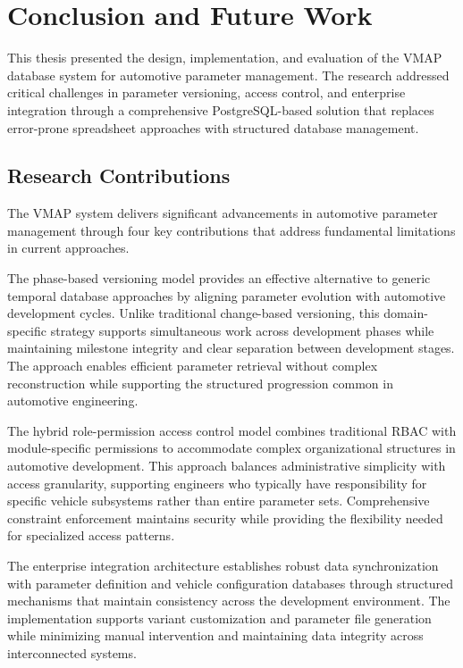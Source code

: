 \chapter{Conclusion and Future Work}
\label{chap:conclusion}

This thesis presented the design, implementation, and evaluation of the \ac{VMAP} database system for automotive parameter management. The research addressed critical challenges in parameter versioning, access control, and enterprise integration through a comprehensive PostgreSQL-based solution that replaces error-prone spreadsheet approaches with structured database management.

\section{Research Contributions}
\label{sec:research-contributions}

The \ac{VMAP} system delivers significant advancements in automotive parameter management through four key contributions that address fundamental limitations in current approaches.

The phase-based versioning model provides an effective alternative to generic temporal database approaches by aligning parameter evolution with automotive development cycles. Unlike traditional change-based versioning, this domain-specific strategy supports simultaneous work across development phases while maintaining milestone integrity and clear separation between development stages. The approach enables efficient parameter retrieval without complex reconstruction while supporting the structured progression common in automotive engineering.

The hybrid role-permission access control model combines traditional \ac{RBAC} with module-specific permissions to accommodate complex organizational structures in automotive development. This approach balances administrative simplicity with access granularity, supporting engineers who typically have responsibility for specific vehicle subsystems rather than entire parameter sets. Comprehensive constraint enforcement maintains security while providing the flexibility needed for specialized access patterns.

The enterprise integration architecture establishes robust data synchronization with parameter definition and vehicle configuration databases through structured mechanisms that maintain consistency across the development environment. The implementation supports variant customization and parameter file generation while minimizing manual intervention and maintaining data integrity across interconnected systems.

